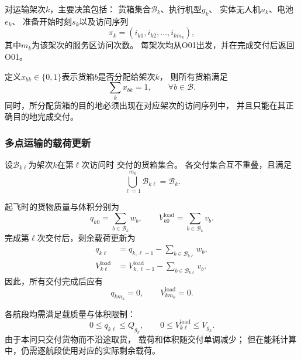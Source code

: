 \documentclass[bwprint]{gmcmthesis}
\begin{document}
对运输架次$k$，主要决策包括：
货箱集合$\mathcal{B}_k$、执行机型$g_k$、
实体无人机$u_k$、电池$e_k$、
准备开始时刻$s_k$以及访问序列
\begin{equation}
    \pi_k=(i_{k1},i_{k2},\ldots,i_{km_k}),
\end{equation}
其中$m_k$为该架次的服务区访问次数。
每架次均从O01出发，并在完成交付后返回O01。

定义$x_{bk}\in\{0,1\}$表示货箱$b$是否分配给架次$k$，
则所有货箱满足
\begin{equation}
    \sum_k x_{bk}=1,
    \qquad \forall b\in\mathcal{B}.
    \label{eq:q2_box_once}
\end{equation}
同时，所分配货箱的目的地必须出现在对应架次的访问序列中，
并且只能在其正确目的地完成交付。

\subsubsection{多点运输的载荷更新}

设$\mathcal{B}_{k\ell}$为架次$k$在第$\ell$次访问时
交付的货箱集合。
各交付集合互不重叠，且满足
\begin{equation}
    \bigcup_{\ell=1}^{m_k}\mathcal{B}_{k\ell}
    =
    \mathcal{B}_k.
\end{equation}

起飞时的货物质量与体积分别为
\begin{equation}
    q_{k0}=\sum_{b\in\mathcal{B}_k}w_b,
    \qquad
    V_{k0}^{\mathrm{load}}
    =
    \sum_{b\in\mathcal{B}_k}v_b.
\end{equation}
完成第$\ell$次交付后，剩余载荷更新为
\begin{align}
    q_{k\ell}
    &=
    q_{k,\ell-1}
    -
    \sum_{b\in\mathcal{B}_{k\ell}}w_b,\\
    V_{k\ell}^{\mathrm{load}}
    &=
    V_{k,\ell-1}^{\mathrm{load}}
    -
    \sum_{b\in\mathcal{B}_{k\ell}}v_b.
\end{align}
因此，所有交付完成后应有
\begin{equation}
    q_{km_k}=0,
    \qquad
    V_{km_k}^{\mathrm{load}}=0.
\end{equation}

各航段均需满足载质量与体积限制：
\begin{equation}
    0\leq q_{k\ell}\leq Q_{g_k},
    \qquad
    0\leq V_{k\ell}^{\mathrm{load}}\leq V_{g_k}.
\end{equation}
由于本问只交付货物而不沿途取货，
载荷和体积随交付单调减少；
但在能耗计算中，仍需逐航段使用对应的实际剩余载荷。
\end{document}
